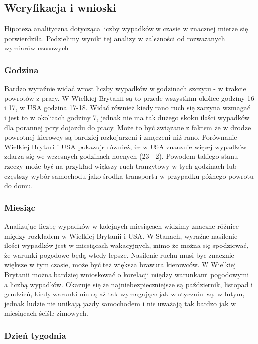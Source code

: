 \subsection{Weryfikacja i wnioski}\label{weryfikacja-i-wnioski}

Hipoteza analityczna dotycząca liczby wypadków w czasie w znacznej
mierze się potwierdziła. Podzielimy wyniki tej analizy w zależności od
rozważanych wymiarów czasowych

\subsubsection{Godzina}\label{godzina}

Bardzo wyraźnie widać wrost liczby wypadków w godzinach szczytu - w
trakcie powrotów z pracy. W Wielkiej Brytanii są to przede wszystkim
okolice godziny 16 i 17, w USA godzina 17-18. Widać również kiedy rano
ruch się zaczyna wzmagać i jest to w okolicach godziny 7, jednak nie ma
tak dużego skoku ilości wypadków dla porannej pory dojazdu do pracy.
Może to być związane z faktem że w drodze powrotnej kierowcy są bardziej
rozkojarzeni i zmęczeni niż rano. Porównanie Wielkiej Brytani i USA
pokazuje również, że w USA znacznie więcej wypadków zdarza się we
wczesnych godzinach nocnych (23 - 2). Powodem takiego stanu rzeczy może
być na przykład większy ruch tranzytowy w tych godzinach lub częstszy
wybór samochodu jako środka transportu w przypadku późnego powrotu do
domu.

\subsubsection{Miesiąc}\label{miesiac}

Analizując liczbę wypadków w kolejnych miesiącach widzimy znaczne
różnice między rozkładem w Wielkiej Brytanii i USA. W Stanach, wyraźne
nasilenie ilości wypadków jest w miesiącach wakacyjnych, mimo że można
się spodziewać, że warunki pogodowe będą wtedy lepsze. Nasilenie ruchu
musi byc znacznie większe w tym czasie, może być też większa brawura
kierowców. W Wielkiej Brytanii można bardziej wnioskować o korelacji
między warunkami pogodowymi a liczbą wypadków. Okazuje się że
najniebezpieczniejsze są październik, listopad i grudzień, kiedy warunki
nie są aż tak wymagające jak w styczniu czy w lutym, jednak ludzie nie
unikają jazdy samochodem i nie uważają tak bardzo jak w miesiącach
ściśle zimowych.

\subsubsection{Dzień tygodnia}\label{dzien-tygodnia}

